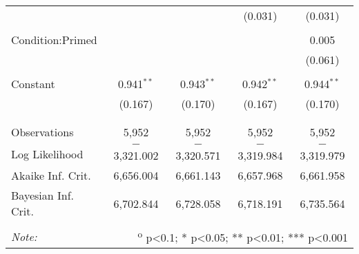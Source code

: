 \begin{table}[!htbp]
\begin{tabular}{@{\extracolsep{5pt}}lcccc}
  &  &  & (0.031) & (0.031) \\
  & & & & \\
 Condition:Primed &  &  &  & 0.005 \\ 
  &  &  &  & (0.061) \\
  & & & & \\
 Constant & 0.941$^{**}$ & 0.943$^{**}$ & 0.942$^{**}$ & 0.944$^{**}$ \\
  & (0.167) & (0.170) & (0.167) & (0.170) \\
  & & & & \\
\hline \\[-1.8ex]
Observations & 5,952 & 5,952 & 5,952 & 5,952 \\
Log Likelihood & $-$3,321.002 & $-$3,320.571 & $-$3,319.984 & $-$3,319.979 \\
Akaike Inf. Crit. & 6,656.004 & 6,661.143 & 6,657.968 & 6,661.958 \\
Bayesian Inf. Crit. & 6,702.844 & 6,728.058 & 6,718.191 & 6,735.564 \\
\hline
\hline \\[-1.8ex]
\textit{Note:}  & \multicolumn{4}{r}{\textsuperscript{o} p<0.1; * p<0.05; ** p<0.01; *** p<0.001} \\
\end{tabular}
\end{table}
